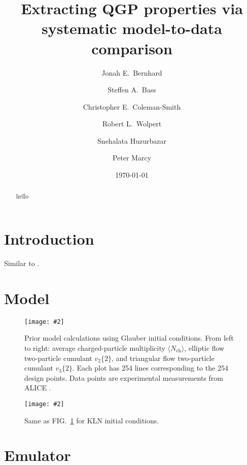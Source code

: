 \documentclass[aps, prc, reprint, amsmath]{revtex4-1}
\newcommand{\widefig}[3][t]{
  \begin{figure*}[#1]
    \texttt{[image: \#2]}
    \caption{\label{fig:#2}#3}
  \end{figure*}
}
\newcommand{\avg}[1]{\langle #1 \rangle}
\newcommand{\nch}{N_\text{ch}}
\newcommand{\vnk}[2]{v_#1\{#2\}}
\begin{document}
\title{Extracting QGP properties via systematic model-to-data comparison}

\author{Jonah E.\ Bernhard}
\author{Steffen A.\ Bass}
\author{Christopher E.\ Coleman-Smith}
\author{Robert L.\ Wolpert}

\author{Snehalata Huzurbazar}

\author{Peter Marcy}


\date{\today}

\begin{abstract}
  hello
\end{abstract}

\maketitle


\section{Introduction}

Similar to \cite{Novak:2013bqa, Soltz:2012rk}.


\section{Model}

\cite{Bass:2000ib, Nonaka:2006yn, Song:2010mg}
\cite{Miller:2007ri}
\cite{Drescher:2006pi}
\cite{Song:2007ux}
\cite{Cooper:1974mv}
\cite{Qiu:2013wca}
\cite{Bass:1998ca, Bleicher:1999xi}
\cite{Shen:2014vra}

\widefig{prior_draws_glb}{
  Prior model calculations using Glauber initial conditions.
  From left to right:
  average charged-particle multiplicity $\avg\nch$,
  elliptic flow two-particle cumulant $\vnk 2 2$,
  and triangular flow two-particle cumulant $\vnk 3 2$.
  Each plot has 254 lines corresponding to the 254 design points.
  Data points are experimental measurements from ALICE \cite{Abelev:2014mda}.
}

\widefig{prior_draws_kln}{
  Same as FIG.~\ref{fig:prior_draws_glb} for KLN initial conditions.
}


\section{Emulator}

\cite{Rasmussen:2006gp}
\cite{OHagan:2006ba, Higdon:2008cmc, Higdon:2014tva}
\end{document}
